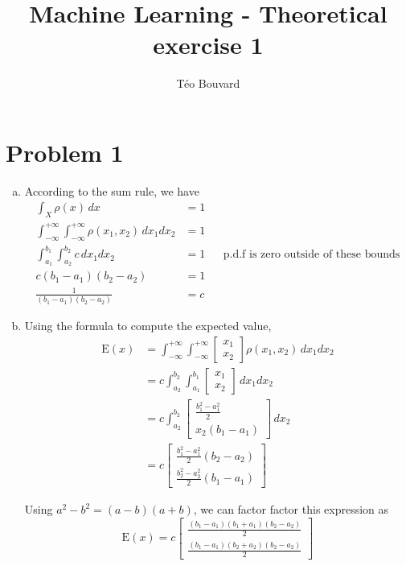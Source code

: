 \documentclass[a4paper, 12pt, twoside]{article}
\begin{document}
\title{Machine Learning - Theoretical exercise 1}
\author{T\'eo Bouvard}
\maketitle

\section{Problem 1}
\begin{enumerate}[a)]
    \item According to the sum rule, we have
    \begin{align*}
        \int_X \rho(x) \,dx &= 1 \\
        \int_{-\infty}^{+\infty}\int_{-\infty}^{+\infty} \rho(x_1, x_2) \,dx_1dx_2 &= 1 \\
        \int_{a_1}^{b_1}\int_{a_2}^{b_2} c \,dx_1dx_2 &= 1 && \text{p.d.f is zero outside of these bounds} \\ 
        c(b_1-a_1)(b_2-a_2) &= 1 \\
        \frac{1}{(b_1-a_1)(b_2-a_2)} &= c
    \end{align*}

    \item Using the formula to compute the expected value,
    \begin{align*}
        \mathrm{E}(x) &= \int_{-\infty}^{+\infty}\int_{-\infty}^{+\infty} \begin{bmatrix} x_1 \\ x_2 \end{bmatrix}\rho(x_1, x_2) \,dx_1dx_2 \\
        &= c \int_{a_2}^{b_2}\int_{a_1}^{b_1} \begin{bmatrix} x_1 \\ x_2 \end{bmatrix} \,dx_1dx_2 \\
        &= c \int_{a_2}^{b_2} \begin{bmatrix} \frac{b_1^2 - a_1^2}{2} \\ x_2(b_1-a_1) \end{bmatrix} \,dx_2 \\
        &= c\begin{bmatrix} \frac{b_1^2 - a_1^2}{2}(b_2-a_2) \\ \frac
        {b_2^2 - a_2^2}{2}(b_1-a_1) \end{bmatrix}
    \end{align*}

    Using $a^2-b^2 = (a-b)(a+b)$, we can factor factor this expression as 
    $$\mathrm{E}(x) = c\begin{bmatrix} \frac{(b_1-a_1)(b_1+a_1)(b_2-a_2)}{2} \\ \frac
    {(b_1-a_1)(b_2+a_2)(b_2-a_2)}{2} \end{bmatrix}$$


\end{enumerate}
\end{document}
